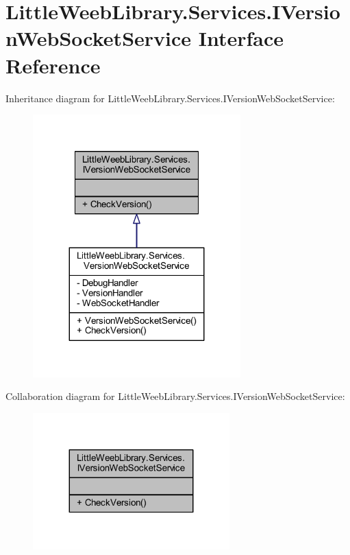 \hypertarget{interface_little_weeb_library_1_1_services_1_1_i_version_web_socket_service}{}\section{Little\+Weeb\+Library.\+Services.\+I\+Version\+Web\+Socket\+Service Interface Reference}
\label{interface_little_weeb_library_1_1_services_1_1_i_version_web_socket_service}


Inheritance diagram for Little\+Weeb\+Library.\+Services.\+I\+Version\+Web\+Socket\+Service\+:\nopagebreak
\begin{figure}[H]
\begin{center}
\leavevmode
\includegraphics[width=227pt]{interface_little_weeb_library_1_1_services_1_1_i_version_web_socket_service__inherit__graph}
\end{center}
\end{figure}


Collaboration diagram for Little\+Weeb\+Library.\+Services.\+I\+Version\+Web\+Socket\+Service\+:\nopagebreak
\begin{figure}[H]
\begin{center}
\leavevmode
\includegraphics[width=215pt]{interface_little_weeb_library_1_1_services_1_1_i_version_web_socket_service__coll__graph}
\end{center}
\end{figure}
